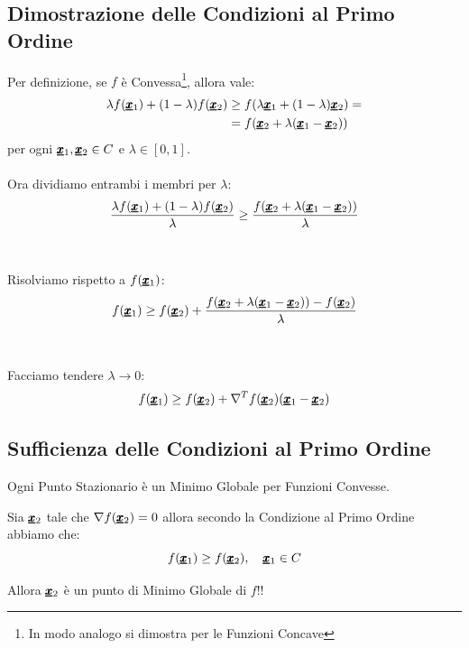 \subsection{Dimostrazione delle Condizioni al Primo Ordine}
Per definizione, se $f$ è Convessa\footnote{In modo analogo si dimostra per le Funzioni Concave}, allora vale:
\begin{equation*}
\begin{aligned}
    \lambda f(\pmb{\underline{x}}_1) + (1 - \lambda) f(\pmb{\underline{x}}_2) &\geq f(\lambda \pmb{\underline{x}}_1 + (1 - \lambda) \pmb{\underline{x}}_2) = \\
    &= f(\pmb{\underline{x}}_2 + \lambda(\pmb{\underline{x}}_1 - \pmb{\underline{x}}_2))
\end{aligned}
\end{equation*}
per ogni $\pmb{\underline{x}}_1, \pmb{\underline{x}}_2 \in C$ e $\lambda \in [0,1]$.\\ \\
Ora dividiamo entrambi i membri per $\lambda$:
\begin{equation*}
    \frac{\lambda f(\pmb{\underline{x}}_1) + (1 - \lambda) f(\pmb{\underline{x}}_2)}{\lambda} \geq \frac{f(\pmb{\underline{x}}_2 + \lambda(\pmb{\underline{x}}_1 - \pmb{\underline{x}}_2))}{\lambda}
\end{equation*}
\\ \\
Risolviamo rispetto a $f(\pmb{\underline{x}}_1)$:
\begin{equation*}
    f(\pmb{\underline{x}}_1) \geq f(\pmb{\underline{x}}_2) + \frac{f(\pmb{\underline{x}}_2 + \lambda(\pmb{\underline{x}}_1 - \pmb{\underline{x}}_2)) - f(\pmb{\underline{x}}_2)}{\lambda}
\end{equation*}
\\ \\
Facciamo tendere $\lambda \longrightarrow 0$:
\begin{equation*}
    f(\pmb{\underline{x}}_1) \geq f(\pmb{\underline{x}}_2) + \nabla^T f(\pmb{\underline{x}}_2)(\pmb{\underline{x}}_1 - \pmb{\underline{x}}_2)
\end{equation*}

\subsection{Sufficienza delle Condizioni al Primo Ordine}
\begin{center}
    Ogni Punto Stazionario è un Minimo Globale per Funzioni Convesse.
\end{center}
Sia $\pmb{\underline{x}}_2$ tale che $\nabla f(\pmb{\underline{x}}_2) = 0$ allora secondo la Condizione al Primo Ordine abbiamo che:
\begin{equation*}
    f(\pmb{\underline{x}}_1) \geq f(\pmb{\underline{x}}_2), \quad \pmb{\underline{x}}_1 \in C
\end{equation*}
\begin{center}
    Allora $\pmb{\underline{x}}_2$ è un punto di Minimo Globale di $f$!!
\end{center}
